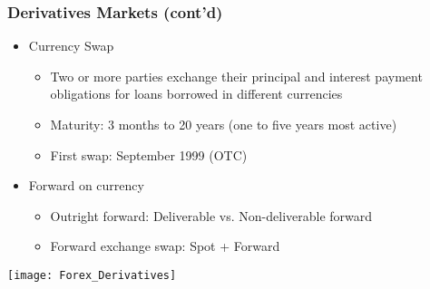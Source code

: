\documentclass[10pt]{beamer}
\begin{document}
	\begin{frame}
		\frametitle{Derivatives Markets (cont'd)}
		
		\begin{itemize}
			
			\item Currency Swap
			\begin{itemize}
				\item Two or more parties exchange their principal and interest payment obligations for loans borrowed in different currencies
				\item Maturity: 3 months to 20 years (one to five years most active)
				\item First swap: September 1999 (OTC)
			\end{itemize}
			
			\item Forward on currency
			\begin{itemize}
				\item Outright forward: Deliverable vs. Non-deliverable forward
				\item Forward exchange swap: Spot + Forward
			\end{itemize}
		\end{itemize}
		
		\begin{center}
			\texttt{[image: Forex\_Derivatives]} 
		\end{center}	
		
	\end{frame}
	
	
	
	
	
\end{document}
